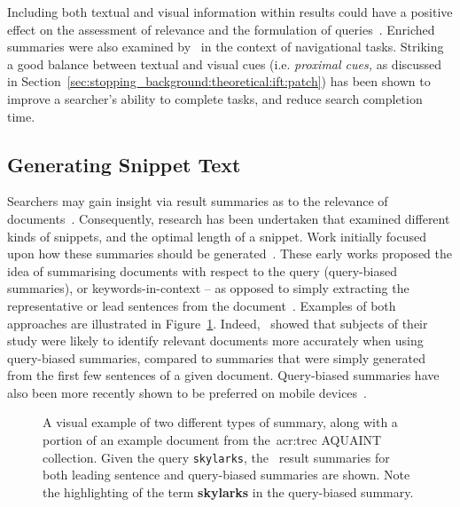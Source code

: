 Including both textual and visual information within results could have a positive effect on the assessment of relevance and the formulation of queries~\citep{joho2006presentation}. Enriched summaries were also examined by~\cite{ali2009interaction_interfaces} in the context of navigational tasks. Striking a good balance between textual and visual cues (i.e. \emph{proximal cues,} as discussed in Section~\ref{sec:stopping_background:theoretical:ift:patch}) has been shown to improve a searcher's ability to complete tasks, and reduce search completion time.

\subsection{Generating Snippet Text}\label{chap:snippets:background:generating}
Searchers may gain insight via result summaries as to the relevance of documents~\citep{he2012bridging}. Consequently, research has been undertaken that examined different kinds of snippets, and the optimal length of a snippet. Work initially focused upon how these summaries should be generated~\citep{pedersen1991snippet, landauer1993enhancing, tombros1998query_biased, white2003task, leal2015query}. These early works proposed the idea of summarising documents with respect to the query (query-biased summaries), or keywords-in-context -- as opposed to simply extracting the representative or lead sentences from the document~\citep{kupiec1995tds}. Examples of both approaches are illustrated in Figure~\ref{fig:snippet_types}. Indeed,~\cite{tombros1998query_biased} showed that subjects of their study were likely to identify relevant documents more accurately when using query-biased summaries, compared to summaries that were simply generated from the first few sentences of a given document. Query-biased summaries have also been more recently shown to be preferred on mobile devices~\citep{spirin2016snippets}.

\begin{figure}[t!]
    \centering
    \caption[Leading sentence and query-biased summary examples]{A visual example of two different types of summary, along with a portion of an example document from the~\gls{acr:trec} AQUAINT collection. Given the query \texttt{skylarks}, the \searchlogo~result summaries for both leading sentence and query-biased summaries are shown. Note the highlighting of the term \textbf{skylarks} in the query-biased summary.}
    \label{fig:snippet_types}
\end{figure}

